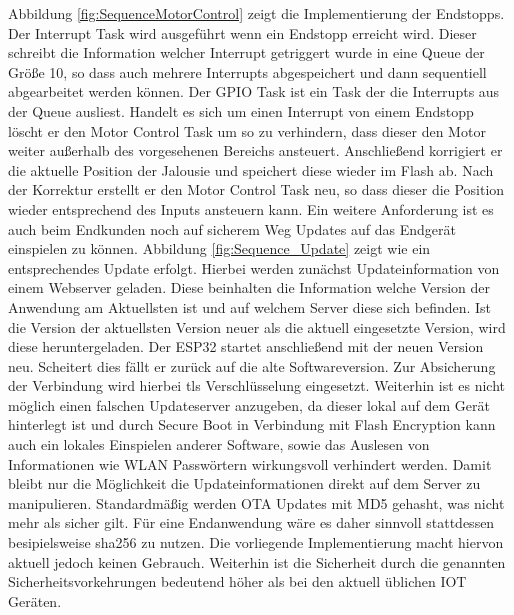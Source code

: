 Abbildung \ref{fig:SequenceMotorControl} zeigt die Implementierung der Endstopps. Der Interrupt Task wird ausgeführt wenn ein Endstopp erreicht wird. Dieser schreibt die Information welcher Interrupt getriggert wurde in eine Queue der Größe 10, so dass auch mehrere Interrupts abgespeichert und dann sequentiell abgearbeitet werden können. Der GPIO Task ist ein Task der die Interrupts aus der Queue ausliest. Handelt es sich um einen Interrupt von einem Endstopp löscht er den Motor Control Task um so zu verhindern, dass dieser den Motor weiter außerhalb des vorgesehenen Bereichs ansteuert. Anschließend korrigiert er die aktuelle Position der Jalousie und speichert diese wieder im Flash ab. Nach der Korrektur erstellt er den Motor Control Task neu, so dass dieser die Position wieder entsprechend des Inputs ansteuern kann. Ein weitere Anforderung ist es auch beim Endkunden noch auf sicherem Weg Updates auf das Endgerät einspielen zu können. Abbildung \ref{fig:Sequence_Update} zeigt wie ein entsprechendes Update erfolgt. Hierbei werden zunächst Updateinformation von einem Webserver geladen. Diese beinhalten die Information welche Version der Anwendung am Aktuellsten ist und auf welchem Server diese sich befinden. Ist die Version der aktuellsten Version neuer als die aktuell eingesetzte Version, wird diese heruntergeladen. Der ESP32 startet anschließend mit der neuen Version neu. Scheitert dies fällt er zurück auf die alte Softwareversion. Zur Absicherung der Verbindung wird hierbei tls Verschlüsselung eingesetzt. Weiterhin ist es nicht möglich einen falschen Updateserver anzugeben, da dieser lokal auf dem Gerät hinterlegt ist und durch Secure Boot in Verbindung mit Flash Encryption kann auch ein lokales Einspielen anderer Software, sowie das Auslesen von Informationen wie WLAN Passwörtern wirkungsvoll verhindert werden. Damit bleibt nur die Möglichkeit die Updateinformationen direkt auf dem Server zu manipulieren. Standardmäßig werden OTA Updates mit MD5 gehasht, was nicht mehr als sicher gilt. Für eine Endanwendung wäre es daher sinnvoll stattdessen besipielsweise sha256 zu nutzen. Die vorliegende Implementierung macht hiervon aktuell jedoch keinen Gebrauch. Weiterhin ist die Sicherheit durch die genannten Sicherheitsvorkehrungen bedeutend höher als bei den aktuell üblichen IOT Geräten.


